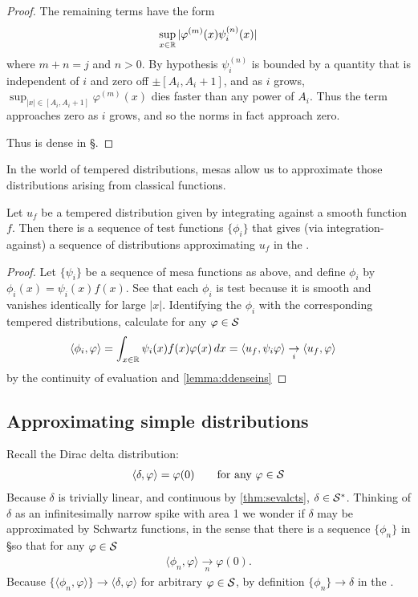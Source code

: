 \begin{proof}
      The remaining terms have the form
      \begin{align*}
        \sup_{x\in\R} |\varphi^{(m)}(x)\psi_i^{(n)}(x)|
      \end{align*}
      where $m+n=j$ and $n>0$.
      By hypothesis $\psi_i^{(n)}$ is bounded by a quantity that is independent of $i$ and zero off $\pm[A_i,A_i+1]$, and as $i$ grows, $\sup_{|x|\in[A_i,A_i+1]}\varphi^{(m)}(x)$ dies faster than any power of $A_i$.
      Thus the term approaches zero as $i$ grows, and so the norms in fact approach zero.

      Thus \D is dense in \S.
    \end{proof}
    In the world of tempered distributions, mesas allow us to approximate those distributions arising from classical functions.
    \begin{lemma}
      \label{lemma:ddenseinssfromsmooth}
      Let $u_f$ be a tempered distribution given by integrating against a smooth function $f$.
      Then there is a sequence of test functions $\{\phi_i\}$ that gives (via integration-against) a sequence of distributions approximating $u_f$ in the \ws.
    \end{lemma}
    \begin{proof}
      Let $\{\psi_i\}$ be a sequence of mesa functions as above, and define $\phi_i$ by $\phi_i(x) = \psi_i(x)f(x)$.
      See that each $\phi_i$ is test because it is smooth and vanishes identically for large $|x|$.
      Identifying the $\phi_i$ with the corresponding tempered distributions, calculate for any $\varphi\in\S$
      \begin{align*}
        \langle \phi_i, \varphi\rangle
        &= \int_{x\in\R} \psi_i(x)f(x)\varphi(x)\,dx
        = \langle u_f, \psi_i\varphi\rangle
        \underset{i}{\rightarrow} \langle u_f, \varphi\rangle
      \end{align*}
      by the continuity of evaluation and \cref{lemma:ddenseins}
    \end{proof}

  \subsection{Approximating simple distributions}
    Recall the Dirac delta distribution:
    \begin{gather*}
      \langle\delta,\varphi\rangle = \varphi(0)
      \qquad\text{for any }\varphi\in\S
    \end{gather*}
    Because $\delta$ is trivially linear, and continuous by \cref{thm:sevalcts}, $\delta\in\SS$.
    Thinking of $\delta$ as an infinitesimally narrow spike with area 1 we wonder if $\delta$ may be approximated by Schwartz functions, in the sense that there is a sequence $\{\phi_n\}$ in \S so that for any $\varphi\in\S$
    \begin{align*}
      \langle \phi_n, \varphi\rangle \underset{n}{\longrightarrow} \varphi(0)\text{.}
    \end{align*}
    Because $\{\langle\phi_n,\varphi\rangle\}\rightarrow\langle\delta,\varphi\rangle$ for arbitrary $\varphi\in\S$, by definition $\{\phi_n\}\rightarrow\delta$ in the \ws.

